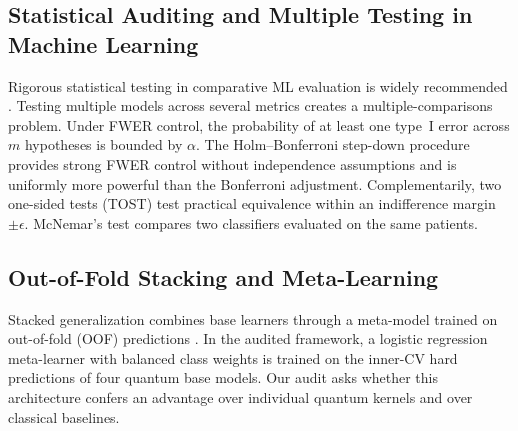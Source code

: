 \documentclass[journal,twocolumn]{IEEEtran}
\begin{document}
\subsection{Statistical Auditing and Multiple Testing in Machine Learning}

Rigorous statistical testing in comparative ML evaluation is widely recommended \cite{demsar2006statistical,efron1994introduction}. Testing multiple models across several metrics creates a multiple-comparisons problem. Under FWER control, the probability of at least one type~I error across $m$ hypotheses is bounded by $\alpha$. The Holm--Bonferroni step-down procedure \cite{holm1979simple} provides strong FWER control without independence assumptions and is uniformly more powerful than the Bonferroni adjustment. Complementarily, two one-sided tests (TOST) \cite{wellek2010testing} test practical equivalence within an indifference margin $\pm \epsilon$. McNemar's test \cite{mcnemar1947note} compares two classifiers evaluated on the same patients.

\subsection{Out-of-Fold Stacking and Meta-Learning}

Stacked generalization combines base learners through a meta-model trained on out-of-fold (OOF) predictions \cite{wolpert1992stacked}. In the audited framework, a logistic regression meta-learner with balanced class weights is trained on the inner-CV hard predictions of four quantum base models. Our audit asks whether this architecture confers an advantage over individual quantum kernels and over classical baselines.
\end{document}
